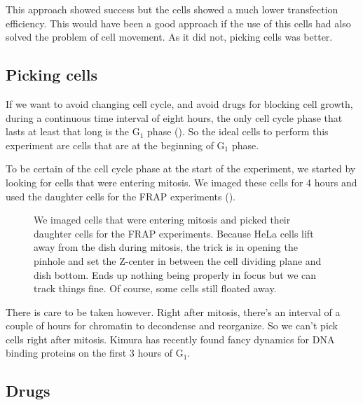     This approach showed success but the cells showed a much lower transfection efficiency. This
    would have been a good approach if the use of this cells had also solved the problem of cell
    movement. As it did not, picking cells was better.

  \subsection{Picking cells}
  
    If we want to avoid changing cell cycle, and avoid drugs for blocking cell growth, during a
    continuous time interval of eight hours, the only cell cycle phase that lasts at least that
    long is the G$_1$ phase (). So the ideal cells to perform this
    experiment are cells that are at the beginning of G$_1$ phase.
    
    To be certain of the cell cycle phase at the start of the experiment, we started by looking for
    cells that were entering mitosis. We imaged these cells for 4 hours and used the daughter cells
    for the FRAP experiments ().
    
    \begin{figure}
      \centering
                   {We imaged cells that were entering mitosis and picked their
                    daughter cells for the FRAP experiments. Because HeLa cells lift
                    away from the dish during mitosis, the trick is in opening the
                    pinhole and set the Z-center in between the cell dividing plane
                    and dish bottom. Ends up nothing being properly in focus but we
                    can track things fine. Of course, some cells still floated away.}
      \label{fig:picking-cells}
    \end{figure}
    
    There is care to be taken however. Right after mitosis, there's an interval of a couple of
    hours for chromatin to decondense and reorganize. So we can't pick cells right after mitosis.
    Kimura has recently found fancy dynamics for DNA binding proteins  on the first 3 hours of G$_1$.
    

  \subsection{Drugs}
  
